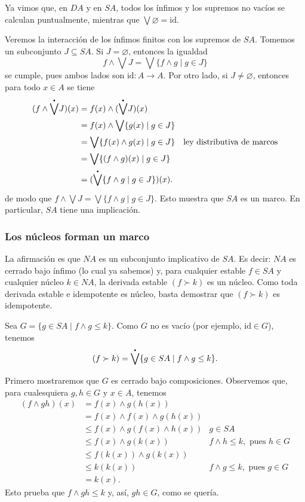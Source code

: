 \documentclass[12pt,letterpaper,titlepage]{article}
\let\emptyset\varnothing
\theoremstyle{definition}
\newcommand\Sup{\bigvee}
\renewcommand\inf{\wedge}
\newcommand\pSup{%
    {\stackrel{\raisebox{-3pt}{\scalebox{0.5}{$\bullet$}}}{\bigvee}}
  }%
\newcommand\<{\langle}
\renewcommand\>{\rangle}
\newcommand{\id}{\mathrm{id}}
\begin{document}
Ya vimos que, en $DA$ y en $SA$, todos los ínfimos
y los supremos no vacíos se calculan puntualmente,
mientras que $\Sup\emptyset=\id$.


Veremos la interacción de los ínfimos finitos con los supremos de
$SA$.
Tomemos un subconjunto $J\subseteq SA$.
Si $J=\emptyset$, entonces la igualdad
\[
  f\inf \Sup J = \Sup\{f\inf g \mid g\in J\}
\]
se cumple, pues ambos lados son $\id:A\to A$.
Por otro lado, si $J\neq\emptyset$, entonces para todo $x\in A$
se tiene
\begin{align*}
  (f\inf \pSup J)(x)
  &= f(x)\inf (\pSup J)(x) \\
  &= f(x)\inf \Sup\{g(x) \mid g\in J\} \\
  &= \Sup\{f(x)\inf g(x) \mid g\in J\}
    & \text{ley distributiva de marcos} \\
  &= \Sup\{(f\inf g)(x) \mid g\in J\} \\
  &= (\pSup\{f\inf g \mid g\in J\})(x).
\end{align*}
de modo que $f\inf\Sup J = \Sup\{f\inf g\mid g\in J\}$.
Esto muestra que $SA$ es un marco.
En particular, $SA$ tiene una implicación.

\subsubsection{Los núcleos forman un marco}

La afirmación es que $NA$ es un subconjunto implicativo de $SA$.
Es decir: $NA$ es cerrado bajo ínfimo (lo cual ya sabemos) y,
para cualquier estable $f\in SA$ y cualquier núcleo $k\in NA$, la
derivada estable $(f\succ k)$ es un núcleo.
Como toda derivada estable e idempotente es núcleo,
basta demostrar que $(f\succ k)$ es idempotente.

Sea $G=\{g\in SA \mid f\inf g\leq k\}$.
Como $G$ no es vacío (por ejemplo, $\id\in G$), tenemos
\[
  (f\succ k) = \pSup\{g\in SA \mid f\inf g\leq k\}
.\]

Primero mostraremos que $G$ es cerrado bajo composiciones.
Observemos que, para cualesquiera $g,h\in G$ y $x\in A$, tenemos
\begin{align*}
  (f\inf gh)(x)
  &= f(x)\inf g(h(x)) \\
  &= f(x)\inf f(x) \inf g(h(x)) \\
  &\leq f(x) \inf g(f(x)\inf h(x))
    & g\in SA \\
  &\leq f(x) \inf g(k(x))
    & f\inf h \leq k, \text{ pues } h\in G \\
  &\leq f(k(x)) \inf g(k(x)) \\
  &\leq k(k(x))
    & f\inf g \leq k, \text{ pues } g\in G \\
  &= k(x).
\end{align*}
Esto prueba que $f\inf gh \leq k$ y, así, $gh\in G$, como se
quería.
\end{document}
